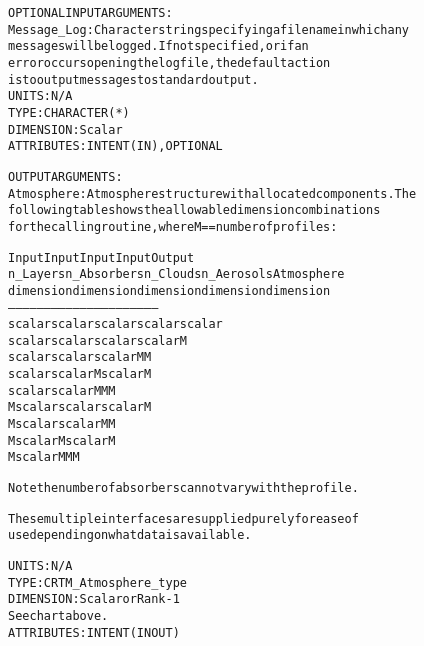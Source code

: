 \begin{alltt}
  OPTIONAL INPUT ARGUMENTS:
        Message_Log:  Character string specifying a filename in which any
                      messages will be logged. If not specified, or if an
                      error occurs opening the log file, the default action
                      is to output messages to standard output.
                      UNITS:      N/A
                      TYPE:       CHARACTER(*)
                      DIMENSION:  Scalar
                      ATTRIBUTES: INTENT(IN), OPTIONAL
 
  OUTPUT ARGUMENTS:
        Atmosphere:   Atmosphere structure with allocated components. The
                      following table shows the allowable dimension combinations
                      for the calling routine, where M == number of profiles:
 
                         Input       Input       Input      Input        Output
                        n_Layers   n_Absorbers  n_Clouds  n_Aerosols    Atmosphere
                        dimension   dimension   dimension  dimension    dimension
                      --------------------------------------------------------------
                         scalar      scalar      scalar     scalar       scalar
                         scalar      scalar      scalar     scalar         M
                         scalar      scalar      scalar       M            M
                         scalar      scalar        M        scalar         M
                         scalar      scalar        M          M            M
                           M         scalar      scalar     scalar         M
                           M         scalar      scalar       M            M
                           M         scalar        M        scalar         M
                           M         scalar        M          M            M
 
                      Note the number of absorbers cannot vary with the profile.
 
                      These multiple interfaces are supplied purely for ease of
                      use depending on what data is available.
                      
                      UNITS:      N/A
                      TYPE:       CRTM_Atmosphere_type
                      DIMENSION:  Scalar or Rank-1
                                  See chart above.
                      ATTRIBUTES: INTENT(IN OUT)
 

\end{alltt}
